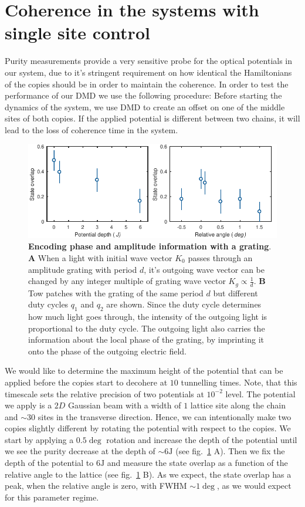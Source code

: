 \section{Coherence in the systems with single site control} 
Purity measurements provide a very sensitive probe for the optical potentials in our system, due to it's stringent requirement on how identical the Hamiltonians of the copies should be in order to maintain the coherence. In order to test the performance of our DMD we use the following procedure: Before starting the dynamics of the system, we use DMD to create an offset on one of the middle sites of both copies. If the applied potential is different between two chains, it will lead to the loss of coherence time in the system.

\begin{figure}[t]
	\centering
	\includegraphics[scale=1]{figures/CBH_pattern_rotation.pdf}
	\caption{{\bf Encoding phase and amplitude information with a grating}. {\bf A} When a light with initial wave vector $K_0$ passes through an amplitude grating with period $d$, it's outgoing wave vector can be changed by any integer multiple of grating wave vector $K_g\propto \frac{1}{d}$. {\bf B} Tow patches with the grating of the same period $d$ but different duty cycles $q_1$ and $q_2$ are shown. Since the duty cycle determines how much light goes through, the intensity of the outgoing light is proportional to the duty cycle. The outgoing light also carries the information about the local phase of the grating, by imprinting it onto the phase of the outgoing electric field.}
	\label{fig:CBH_pattern_rotation}
\end{figure}

We would like to determine the maximum height of the potential that can be applied before the copies start to decohere at $10$ tunnelling times. Note, that this timescale sets the relative precision of two potentials at $10^{-2}$ level. The potential we apply is a $2D$ Gaussian beam with a width of $1$ lattice site along the chain and $\sim 30$ sites in the transverse direction. Hence, we can intentionally make two copies slightly different by rotating the potential with respect to the copies. We start by applying a $0.5\deg$ rotation and increase the depth of the potential until we see the purity decrease at the depth of $\sim 6\mathrm{J}$ (see fig.~\ref{fig:CBH_pattern_rotation} A). Then we fix the depth of the potential to $6\mathrm{J}$ and measure the state overlap as a function of the relative angle to the lattice (see fig.~\ref{fig:CBH_pattern_rotation} B). As we expect, the state overlap has a peak, when the relative angle is zero, with FWHM $\sim 1\deg$, as we would expect for this parameter regime.

